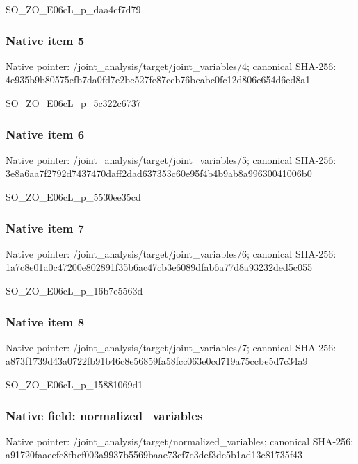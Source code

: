\documentclass[10pt,a4paper]{article}
\begin{document}
SO\_ZO\_E06cL\_p\_daa4cf7d79


\subsubsection{Native item 5}


Native pointer: /joint\_analysis/target/j\allowbreak{}oint\_variables/4; canonical SHA-256: 4e935b9b80575efb7da0fd7e\allowbreak{}2bc527fe87ceb76bcabc0fc1\allowbreak{}2d806e654d6ed8a1


SO\_ZO\_E06cL\_p\_5c322c6737


\subsubsection{Native item 6}


Native pointer: /joint\_analysis/target/j\allowbreak{}oint\_variables/5; canonical SHA-256: 3e8a6aa7f2792d7437470daf\allowbreak{}f2dad637353c60e95f4b4b9a\allowbreak{}b8a99630041006b0


SO\_ZO\_E06cL\_p\_5530ee35cd


\subsubsection{Native item 7}


Native pointer: /joint\_analysis/target/j\allowbreak{}oint\_variables/6; canonical SHA-256: 1a7c8e01a0c47200e802891f\allowbreak{}35b6ac47cb3e6089dfab6a77\allowbreak{}d8a93232ded5c055


SO\_ZO\_E06cL\_p\_16b7e5563d


\subsubsection{Native item 8}


Native pointer: /joint\_analysis/target/j\allowbreak{}oint\_variables/7; canonical SHA-256: a873f1739d43a0722fb91b46\allowbreak{}c8e56859fa58fcc063e0cd71\allowbreak{}9a75ccbe5d7c34a9


SO\_ZO\_E06cL\_p\_15881069d1


\subsubsection{Native field: normalized\_variables}


Native pointer: /joint\_analysis/target/n\allowbreak{}ormalized\_variables; canonical SHA-256: a91720faaeefc8fbcf003a99\allowbreak{}37b5569baae73cf7c3def3dc\allowbreak{}5b1ad13e81735f43
\end{document}
